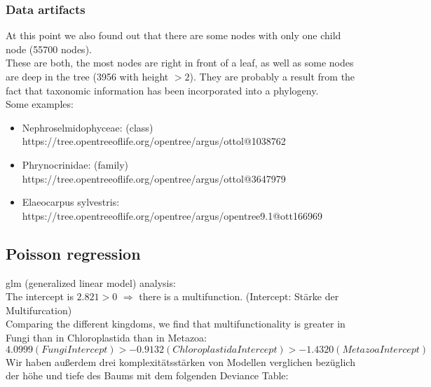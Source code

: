       \subsubsection{Data artifacts}
      At this point we also found out that there are some nodes with only one child node (55700 nodes). \\
      These are both, the most nodes are right in front of a leaf, as well as some nodes are deep in the 
        tree (3956 with height $>2$). They are probably a result from the fact that taxonomic information 
        has been incorporated into a phylogeny. \\
      Some examples:
      \begin{itemize}
        \item Nephroselmidophyceae: (class) \\
          https://tree.opentreeoflife.org/opentree/argus/ottol@1038762
        \item Phrynocrinidae: (family) \\
          https://tree.opentreeoflife.org/opentree/argus/ottol@3647979
        \item Elaeocarpus sylvestris: \\
          https://tree.opentreeoflife.org/opentree/argus/opentree9.1@ott166969
      \end{itemize}
     
      \subsection{Poisson regression}
        glm (generalized linear model) analysis: \\
      
        
        The intercept is $2.821 > 0$ $\Rightarrow$ there is a multifunction.
        (Intercept: Stärke der Multifurcation) \\
        Comparing the different kingdoms, we find that multifunctionality is greater in Fungi than in 
        Chloroplastida than in Metazoa:
        $$4.0999 (Fungi Intercept) > -0.9132 (Chloroplastida Intercept) > -1.4320 (Metazoa Intercept)$$
        Wir haben außerdem drei komplexitätsstärken von Modellen verglichen bezüglich der höhe und tiefe 
          des Baums mit dem folgenden Deviance Table:
          
